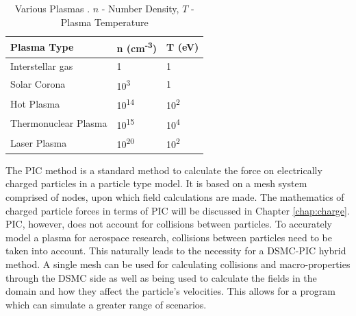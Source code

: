 \begin{table}
\caption[Various Plasmas]{Various Plasmas \cite{plasma_table}. \(n\) - Number Density, \(T\) - Plasma Temperature}
\label{tab:plasma}
\vspace{0.3cm}
\begin{center}
\begin{tabular}{|lll|}
\hline
Plasma Type          & n (cm\textsuperscript{-3}) & T (eV)                  \\ \hline
Interstellar gas     & 1                        & 1                     \\
Solar Corona         & 10\textsuperscript{3}    & 1                     \\
Hot Plasma           & 10\textsuperscript{14}   & 10\textsuperscript{2} \\
Thermonuclear Plasma & 10\textsuperscript{15}   & 10\textsuperscript{4} \\
Laser Plasma         & 10\textsuperscript{20}   & 10\textsuperscript{2} \\ \hline
\end{tabular}
\end{center}
\end{table}

\indent The PIC method is a standard method to calculate the force on electrically charged particles in a particle type model. It is based on a mesh system comprised of nodes, upon which field calculations are made. The mathematics of charged particle forces in terms of PIC will be discussed in Chapter \ref{chap:charge}. PIC, however, does not account for collisions between particles. To accurately model a plasma for aerospace research, collisions between particles need to be taken into account. This naturally leads to the necessity for a DSMC-PIC hybrid method. A single mesh can be used for calculating collisions and macro-properties through the DSMC side as well as being used to calculate the fields in the domain and how they affect the particle's velocities. This allows for a program which can simulate a greater range of scenarios. \par


